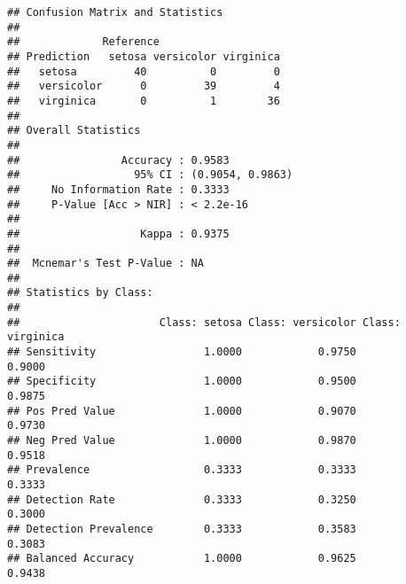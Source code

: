 \documentclass[
]{article}
\newenvironment{Shaded}{\begin{snugshade}}{\end{snugshade}}
\newcommand{\AttributeTok}[1]{\textcolor[rgb]{0.77,0.63,0.00}{#1}}
\newcommand{\CommentTok}[1]{\textcolor[rgb]{0.56,0.35,0.01}{\textit{#1}}}
\newcommand{\DecValTok}[1]{\textcolor[rgb]{0.00,0.00,0.81}{#1}}
\newcommand{\FunctionTok}[1]{\textcolor[rgb]{0.00,0.00,0.00}{#1}}
\newcommand{\NormalTok}[1]{#1}
\newcommand{\OtherTok}[1]{\textcolor[rgb]{0.56,0.35,0.01}{#1}}
\newcommand{\SpecialCharTok}[1]{\textcolor[rgb]{0.00,0.00,0.00}{#1}}
\newcommand{\StringTok}[1]{\textcolor[rgb]{0.31,0.60,0.02}{#1}}
\begin{document}
\begin{Shaded}
\end{Shaded}

\begin{verbatim}
## Confusion Matrix and Statistics
## 
##             Reference
## Prediction   setosa versicolor virginica
##   setosa         40          0         0
##   versicolor      0         39         4
##   virginica       0          1        36
## 
## Overall Statistics
##                                           
##                Accuracy : 0.9583          
##                  95% CI : (0.9054, 0.9863)
##     No Information Rate : 0.3333          
##     P-Value [Acc > NIR] : < 2.2e-16       
##                                           
##                   Kappa : 0.9375          
##                                           
##  Mcnemar's Test P-Value : NA              
## 
## Statistics by Class:
## 
##                      Class: setosa Class: versicolor Class: virginica
## Sensitivity                 1.0000            0.9750           0.9000
## Specificity                 1.0000            0.9500           0.9875
## Pos Pred Value              1.0000            0.9070           0.9730
## Neg Pred Value              1.0000            0.9870           0.9518
## Prevalence                  0.3333            0.3333           0.3333
## Detection Rate              0.3333            0.3250           0.3000
## Detection Prevalence        0.3333            0.3583           0.3083
## Balanced Accuracy           1.0000            0.9625           0.9438
\end{verbatim}

\begin{Shaded}
\end{Shaded}
\end{document}
